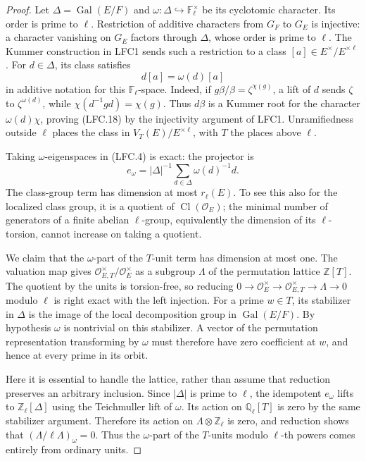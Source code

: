 \begin{proof}
Let \(\Delta=\operatorname{Gal}(E/F)\) and
\(\omega:\Delta\hookrightarrow\mathbb F_\ell^\times\)
be its cyclotomic character.  Its order is prime to \(\ell\).
Restriction of additive characters from \(G_F\) to \(G_E\)
is injective: a character vanishing on \(G_E\) factors
through \(\Delta\), whose order is prime to \(\ell\).
The Kummer construction in LFC1 sends such a restriction
to a class \([a]\in E^\times/E^{\times\ell}\).
For \(d\in\Delta\), its class satisfies
\[
                         d[a]=\omega(d)[a]               \tag{LFC.18}
\]
in additive notation for this \(\mathbb F_\ell\)-space.
Indeed, if \(g\beta/\beta=\zeta^{\chi(g)}\), a lift of \(d\)
sends \(\zeta\) to \(\zeta^{\omega(d)}\), while
\(\chi(d^{-1}gd)=\chi(g)\).  Thus \(d\beta\) is a
Kummer root for the character \(\omega(d)\chi\),
proving (LFC.18) by the injectivity argument of LFC1.
Unramifiedness outside \(\ell\) places the class in
\(V_T(E)/E^{\times\ell}\), with \(T\) the places above \(\ell\).

Taking \(\omega\)-eigenspaces in (LFC.4) is exact:
the projector is
\[
 e_\omega=|\Delta|^{-1}
           \sum_{d\in\Delta}\omega(d)^{-1}d.
 \]
The class-group term has dimension at most \(r_\ell(E)\).
To see this also for the localized class group, it is a
quotient of \(\operatorname{Cl}(\mathcal O_E)\);
the minimal number of generators of a finite abelian
\(\ell\)-group, equivalently the dimension of its
\(\ell\)-torsion, cannot increase on taking a quotient.

We claim that the \(\omega\)-part of the \(T\)-unit term
has dimension at most one.  The valuation map gives
\(\mathcal O_{E,T}^\times/\mathcal O_E^\times\) as a
subgroup \(\Lambda\) of the permutation lattice
\(\mathbb Z[T]\).  The quotient by the units is torsion-free,
so reducing
\(0\to\mathcal O_E^\times\to
 \mathcal O_{E,T}^\times\to\Lambda\to0\)
modulo \(\ell\) is right exact with the left injection.
For a prime \(w\in T\), its stabilizer in \(\Delta\) is
the image of the local decomposition group in
\(\operatorname{Gal}(E/F)\).  By hypothesis \(\omega\)
is nontrivial on this stabilizer.  A vector of the
permutation representation transforming by \(\omega\)
must therefore have zero coefficient at \(w\), and hence
at every prime in its orbit.

Here it is essential to handle the lattice, rather than
assume that reduction preserves an arbitrary inclusion.
Since \(|\Delta|\) is prime to \(\ell\), the idempotent
\(e_\omega\) lifts to \(\mathbb Z_\ell[\Delta]\) using
the Teichmuller lift of \(\omega\).
Its action on \(\mathbb Q_\ell[T]\) is zero by the same
stabilizer argument.  Therefore its action on
\(\Lambda\otimes\mathbb Z_\ell\) is zero, and reduction
shows that \((\Lambda/\ell\Lambda)_\omega=0\).
Thus the \(\omega\)-part of the \(T\)-units modulo
\(\ell\)-th powers comes entirely from ordinary units.


\end{proof}
